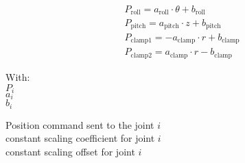 \begin{equation} 
\begin{split}
	&P_\textrm{roll} = a_\textrm{roll}\cdot \theta + b_\textrm{roll}\\
	&P_\textrm{pitch} = a_\textrm{pitch}\cdot z + b_\textrm{pitch}\\
	&P_\textrm{clamp1} = -a_\textrm{clamp} \cdot r + b_\textrm{clamp}\\
	&P_\textrm{clamp2} = a_\textrm{clamp} \cdot r - b_\textrm{clamp} 
\end{split}
\label{eq:cartesian_to_cylindrical}
\end{equation}

\begin{minipage}[t]{0.20\textwidth}
With:\\
\hspace*{8mm} $P_i$\\
\hspace*{8mm} $a_i$ \\
\hspace*{8mm} $b_i$ 
\end{minipage}
\begin{minipage}[t]{0.68\textwidth}
\vspace*{2mm}
Position command sent to the joint $i$\\
constant scaling coefficient for joint $i$\\
constant scaling offset for joint $i$
\end{minipage}
